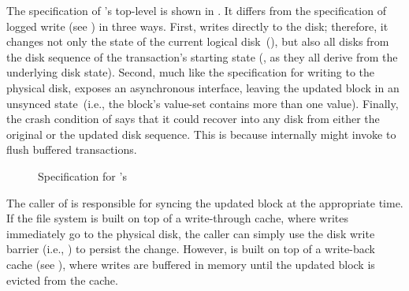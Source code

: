 The specification of \syslog's top-level  is shown in
.  It differs from the specification of logged
write (see ) in three ways. First, 
writes directly to the disk; therefore, it changes not only the state of
the current logical disk~(), but also all disks from the disk
sequence of the transaction's starting state (, as they
all derive from the underlying disk state).  Second, much like the
specification for writing to the physical disk,  exposes an
asynchronous interface, leaving the updated block in an unsynced
state~(i.e., the block's value-set contains more than one value).
Finally, the crash condition of  says that it could recover
into any disk from either the original or the updated disk sequence.  This
is because  internally might invoke  to
flush buffered transactions.

\begin{figure}[htb]
\centering
\begin{spec}
\end{spec}
\caption{Specification for \logapi's }
\label{fig:log_dwrite_ok}
\end{figure}

The caller of  is responsible for syncing the updated block
at the appropriate time.  If the file system is built on top of a write-through
cache, where writes immediately go to the physical disk, the caller can
simply use the disk write barrier (i.e., ) to persist the
change.  However, \sys is built on top of a write-back cache (see
), where writes are buffered in memory until the updated
block is evicted from the cache.

